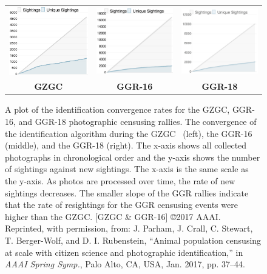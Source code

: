 \begin{figure}[!t]
    \begin{center}
        \begin{tabular}{ccc}
            \includegraphics[width=0.32\linewidth]{resources/convergence-gzgc.pdf} &
            \includegraphics[width=0.32\linewidth]{resources/convergence-ggr.pdf}  &
            \includegraphics[width=0.32\linewidth]{resources/convergence-ggr18.pdf}  \\
            \textbf{GZGC}                                                          &
            \textbf{GGR-16}                                                        &
            \textbf{GGR-18}
        \end{tabular}
    \end{center}
    \caption{A plot of the identification convergence rates for the GZGC, GGR-16, and GGR-18 photographic censusing rallies.  The convergence of the identification algorithm during the GZGC~\cite{parham_photographic_2015} (left), the GGR-16 (middle), and the GGR-18 (right).  The x-axis shows all collected photographs in chronological order and the y-axis shows the number of sightings against new sightings.  The x-axis is the same scale as the y-axis.  As photos are processed over time, the rate of new sightings decreases.  The smaller slope of the GGR rallies indicate that the rate of resightings for the GGR censusing events were higher than the GZGC.  [GZGC \& GGR-16] \copyright 2017 AAAI. Reprinted, with permission, from: J. Parham, J. Crall, C. Stewart, T. Berger-Wolf, and D. I. Rubenstein, ``Animal population censusing at scale with citizen science and photographic identification,'' in \textit{AAAI Spring Symp.}, Palo Alto, CA, USA, Jan. 2017, pp. 37–44.}
    \label{fig:convergence}
\end{figure}

